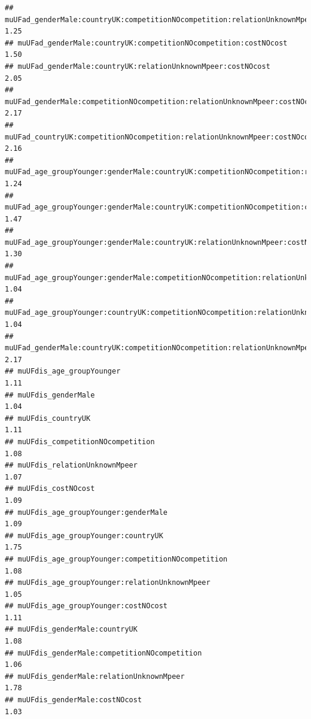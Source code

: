 \documentclass[
]{article}
\begin{document}
\begin{verbatim}
## muUFad_genderMale:countryUK:competitionNOcompetition:relationUnknownMpeer                    1.25
## muUFad_genderMale:countryUK:competitionNOcompetition:costNOcost                              1.50
## muUFad_genderMale:countryUK:relationUnknownMpeer:costNOcost                                  2.05
## muUFad_genderMale:competitionNOcompetition:relationUnknownMpeer:costNOcost                   2.17
## muUFad_countryUK:competitionNOcompetition:relationUnknownMpeer:costNOcost                    2.16
## muUFad_age_groupYounger:genderMale:countryUK:competitionNOcompetition:relationUnknownMpeer   1.24
## muUFad_age_groupYounger:genderMale:countryUK:competitionNOcompetition:costNOcost             1.47
## muUFad_age_groupYounger:genderMale:countryUK:relationUnknownMpeer:costNOcost                 1.30
## muUFad_age_groupYounger:genderMale:competitionNOcompetition:relationUnknownMpeer:costNOcost  1.04
## muUFad_age_groupYounger:countryUK:competitionNOcompetition:relationUnknownMpeer:costNOcost   1.04
## muUFad_genderMale:countryUK:competitionNOcompetition:relationUnknownMpeer:costNOcost         2.17
## muUFdis_age_groupYounger                                                                     1.11
## muUFdis_genderMale                                                                           1.04
## muUFdis_countryUK                                                                            1.11
## muUFdis_competitionNOcompetition                                                             1.08
## muUFdis_relationUnknownMpeer                                                                 1.07
## muUFdis_costNOcost                                                                           1.09
## muUFdis_age_groupYounger:genderMale                                                          1.09
## muUFdis_age_groupYounger:countryUK                                                           1.75
## muUFdis_age_groupYounger:competitionNOcompetition                                            1.08
## muUFdis_age_groupYounger:relationUnknownMpeer                                                1.05
## muUFdis_age_groupYounger:costNOcost                                                          1.11
## muUFdis_genderMale:countryUK                                                                 1.08
## muUFdis_genderMale:competitionNOcompetition                                                  1.06
## muUFdis_genderMale:relationUnknownMpeer                                                      1.78
## muUFdis_genderMale:costNOcost                                                                1.03

\end{verbatim}
\end{document}
